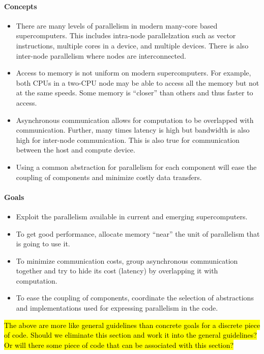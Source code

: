 \documentclass{article}
\begin{document}
\paragraph{Concepts}
\begin{itemize}
  \item  There are many levels of parallelism in modern many-core based supercomputers.  This includes intra-node parallelzation such as vector instructions, multiple cores in a device, and multiple devices.
  There is also inter-node parallelism where nodes are interconnected.
  \item Access to memory is not uniform on modern supercomputers.  For example, both CPUs in a two-CPU node may be able to access all the memory but not at the same speeds.  Some memory is ``closer'' than others and thus faster to access.
  \item Asynchronous communication allows for computation to be overlapped with communication.
  Further, many times latency is high but bandwidth is also high for inter-node communication.  This is also true for communication between the host and compute device.
  \item Using a common abstraction for parallelism for each component will ease the coupling of components and minimize costly data transfers.
\end{itemize}

\paragraph{Goals}
\begin{itemize}
  \item Exploit the parallelism available in current and emerging supercomputers.
  \item To get good performance, allocate memory ``near'' the unit of parallelism that is going to use it.
  \item To minimize communication costs, group asynchronous communication together and try to hide its cost (latency) by overlapping it with computation.
  \item To ease the coupling of components, coordinate the selection of abstractions and implementations used for expressing parallelism in the code.
\end{itemize}
 
\hl{The above are more like general guidelines than concrete goals for a discrete piece of code. Should we eliminate this section and work it into the general guidelines? Or will there some piece of code that can be associated with this section?}
\end{document}
